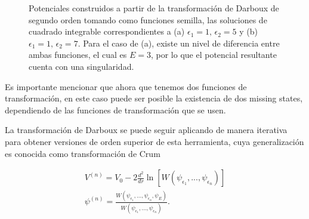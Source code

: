 \begin{figure}
	\hfill%
	\hfill%
	\caption{\label{TD2OA1-Figure} Potenciales construidos a partir de la transformación de Darboux de segundo orden tomando como funciones semilla, las soluciones de cuadrado integrable correspondientes a (a) $\epsilon_1=1, \, \epsilon_2=5$ y (b) $\epsilon_1=1, \, \epsilon_2=7$. Para el caso de (a), existe un nivel de diferencia entre ambas funciones, el cual es $E=3$, por lo que el potencial resultante cuenta con una singularidad.
	}
\end{figure}

Es importante mencionar que ahora que tenemos dos funciones de transformación, en este caso puede ser posible la existencia de dos missing states, dependiendo de las funciones de transformación que se usen.

La transformación de Darboux se puede seguir aplicando de manera iterativa para obtener versiones de orden superior de esta herramienta, cuya generalización es conocida como transformación de Crum

\begin{eqnarray*}
	V^{(n)} = V_0 - 2 \frac{d^2}{dr}\ln[W(\psi_{\epsilon_1},...,\psi_{\epsilon_n})]
	\\
	\psi^{(n)} = \frac{W(\psi_{\epsilon_1},...,\psi_{\epsilon_n},\psi_E)}{W(\psi_{\epsilon_1},...,\psi_{\epsilon_n})}.
\end{eqnarray*}



